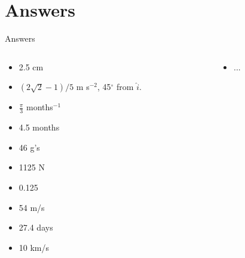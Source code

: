 \documentclass{beamer}
\begin{document}
\section{Answers}

\begin{frame}{Answers}
\begin{columns}[T]
\begin{column}{0.5\textwidth}
\begin{itemize}
\item 2.5 cm
\item $(2\sqrt{2}-1)/5$ m s$^{-2}$, 45$^{\circ}$ from $\hat{i}$.
\item $\frac{\pi}{3}$ months$^{-1}$
\item 4.5 months
\item 46 g's
\item 1125 N
\item 0.125
\item 54 m/s
\item 27.4 days
\item 10 km/s
\end{itemize}
\end{column}
\begin{column}{0.5\textwidth}
\begin{itemize}
\item ... 
\end{itemize}
\end{column}
\end{columns}
\end{frame}
\end{document}
